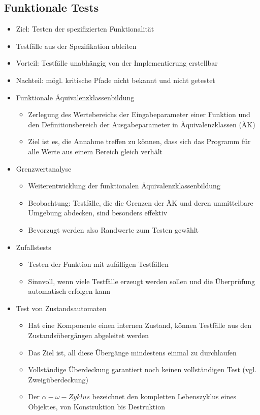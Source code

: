 \documentclass{article}
\begin{document}
\subsection{Funktionale Tests}
\begin{itemize}
  \item Ziel: Testen der spezifizierten Funktionalität
  \item Testfälle aus der Spezifikation ableiten
  \item Vorteil: Testfälle unabhängig von der Implementierung erstellbar
  \item Nachteil: mögl. kritische Pfade nicht bekannt und nicht getestet
  \item Funktionale Äquivalenzklassenbildung
  \begin{itemize}
    \item Zerlegung des Wertebereichs der Eingabeparameter einer Funktion und den Definitionsbereich der Ausgabeparameter in Äquivalenzklassen (ÄK)
    \item Ziel ist es, die Annahme treffen zu können, dass sich das Programm für alle Werte aus einem Bereich gleich verhält  
  \end{itemize}
  \item Grenzwertanalyse
  \begin{itemize}
    \item Weiterentwicklung der funktionalen Äquivalenzklassenbildung
    \item Beobachtung: Testfälle, die die Grenzen der ÄK und deren unmittelbare Umgebung abdecken, sind besonders effektiv
    \item Bevorzugt werden also Randwerte zum Testen gewählt
  \end{itemize}
  \item Zufallstests
  \begin{itemize}
    \item Testen der Funktion mit zufälligen Testfällen
    \item Sinnvoll, wenn viele Testfälle erzeugt werden sollen und die Überprüfung automatisch erfolgen kann
  \end{itemize}
  \item Test von Zustandsautomaten
  \begin{itemize}
    \item Hat eine Komponente einen internen Zustand, können Testfälle aus den Zustandsübergängen abgeleitet werden
    \item Das Ziel ist, all diese Übergänge mindestens einmal zu durchlaufen
    \item Vollständige Überdeckung garantiert noch keinen vollständigen Test (vgl. Zweigüberdeckung)
    \item Der $\alpha-\omega-Zyklus$ bezeichnet den kompletten Lebenszyklus eines Objektes, von Konstruktion bis Destruktion
  \end{itemize}
\end{itemize}
\end{document}
